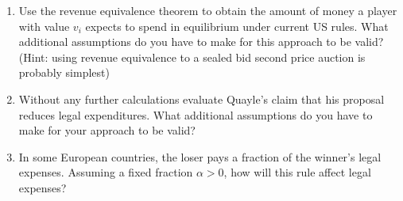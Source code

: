 \documentclass[a4paper,12pt]{article}
\begin{document}
\begin{enumerate}
  \begin{enumerate}
  \item Use the revenue equivalence theorem to obtain the amount of money a player with value $v_i$ expects to spend in equilibrium under current US rules. What additional assumptions do you have to make for this approach to be valid?\\
    (Hint: using revenue equivalence to a sealed bid second price auction is probably simplest)
  \item Without any further calculations evaluate Quayle's claim that his proposal reduces legal expenditures. What additional assumptions do you have to make for your approach to be valid?
  \item In some European countries, the loser pays a fraction of the winner's legal expenses. Assuming a fixed fraction $\alpha>0$, how will this rule affect legal expenses?
  \end{enumerate}

\end{enumerate}
\end{document}
